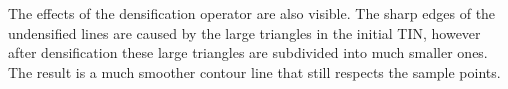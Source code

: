 %


%

The effects of the densification operator are also visible. 
The sharp edges of the undensified lines are caused by the large triangles in the initial TIN, however after densification these large triangles are subdivided into much smaller ones. 
The result is a much smoother contour line that still respects the sample points. 


%


